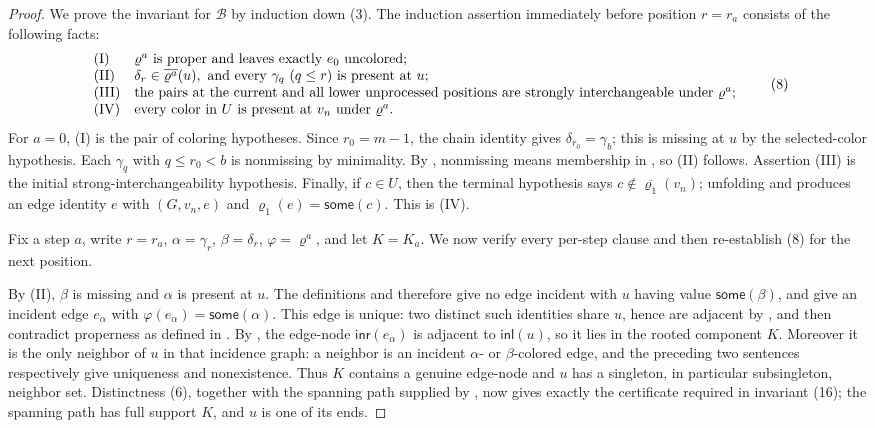\begin{proof}
We prove the invariant for \(\mathcal B\) by induction down (3).  The
induction assertion immediately before position \(r=r_a\) consists of
the following facts:
\[
\begin{array}{ll}
({\rm I}) & \varrho^a\text{ is proper and leaves exactly }e_0
            \text{ uncolored};\\
({\rm II})& \delta_r\in\overline{\varrho^a}(u),\text{ and every }
            \gamma_q\ (q\leq r)\text{ is present at }u;\\
({\rm III})&\text{the pairs at the current and all lower unprocessed
            positions are strongly interchangeable under }\varrho^a;\\
({\rm IV})&\text{every color in }U\text{ is present at }v_n
            \text{ under }\varrho^a.
\end{array}                                                     \tag{8}
\]
For \(a=0\), (I) is the pair of coloring hypotheses.  Since
\(r_0=m-1\), the chain identity gives
\(\delta_{r_0}=\gamma_b\); this is missing at \(u\) by the selected-color
hypothesis.  Each \(\gamma_q\) with \(q\leq r_0<b\) is nonmissing by
minimality.  By , nonmissing means membership in
, so (II) follows.  Assertion (III) is the initial
strong-interchangeability hypothesis.  Finally, if \(c\in U\), then the
terminal hypothesis says \(c\notin\overline{\varrho_1}(v_n)\); unfolding
 and  produces an edge
identity \(e\) with \((G,v_n,e)\) and
\(\varrho_1(e)=\mathsf{some}(c)\).  This is (IV).

Fix a step \(a\), write \(r=r_a\),
\(\alpha=\gamma_r\), \(\beta=\delta_r\),
\(\varphi=\varrho^a\), and let \(K=K_a\).  We now verify every per-step
clause and then re-establish (8) for the next position.

By (II), \(\beta\) is missing and \(\alpha\) is present at \(u\).
The definitions  and 
therefore give no edge incident with \(u\) having value
\(\mathsf{some}(\beta)\), and give an incident edge \(e_\alpha\) with
\(\varphi(e_\alpha)=\mathsf{some}(\alpha)\).  This edge is unique:
two distinct such identities share \(u\), hence are adjacent by
, and then contradict properness as defined in
.  By ,
the edge-node \(\mathsf{inr}(e_\alpha)\) is adjacent to
\(\mathsf{inl}(u)\), so it lies in the rooted component \(K\).  Moreover
it is the only neighbor of \(u\) in that incidence graph: a neighbor is
an incident \(\alpha\)- or \(\beta\)-colored edge, and the preceding two
sentences respectively give uniqueness and nonexistence.  Thus \(K\)
contains a genuine edge-node and \(u\) has a singleton, in particular
subsingleton, neighbor set.  Distinctness (6), together with the
spanning path supplied by , now
gives exactly the  certificate required
in invariant (16); the spanning path has full support \(K\), and \(u\)
is one of its ends.


\end{proof}
